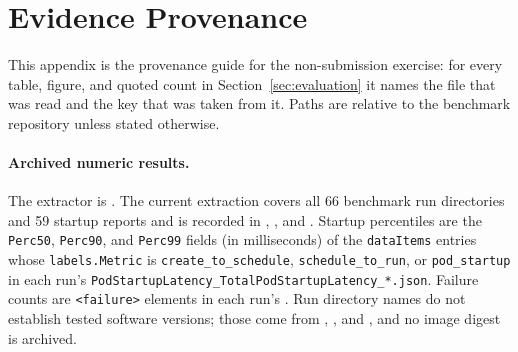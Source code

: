\section{Evidence Provenance}
\label{sec:provenance}
This appendix is the provenance guide for the non-submission exercise:
for every table, figure, and quoted count in Section~\ref{sec:evaluation}
it names the file that was read and the key that was taken from it.
Paths are relative to the benchmark repository unless stated otherwise.

\paragraph{Archived numeric results.}
The extractor is . The current extraction
covers all 66 benchmark run directories and 59 startup reports and is
recorded in ,
, and
. Startup percentiles are
the \texttt{Perc50}, \texttt{Perc90}, and \texttt{Perc99} fields (in
milliseconds) of the \texttt{dataItems} entries whose
\texttt{labels.Metric} is \texttt{create\_to\_schedule},
\texttt{schedule\_to\_run}, or \texttt{pod\_startup} in each run's
\texttt{PodStartupLatency\_TotalPodStartupLatency\_*.json}. Failure
counts are \texttt{<failure>} elements in each run's .
Run directory names do not establish tested software versions; those
come from ,
, and
, and no image digest is archived.

